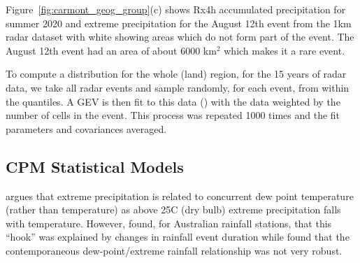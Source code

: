 \documentclass[11pt,a4paper]{article}
\begin{document}
Figure~\ref{fig:carmont_geog_group}(c) shows Rx4h accumulated precipitation for summer 2020 and  extreme precipitation for the August 12th event from the 1km radar dataset with white showing areas which do not form part of the event. The August 12th event had an area of about 6000 km$^2$ which makes it a rare event. 

To compute a distribution for the whole (land) region, for the 15 years of radar data, we take all radar events and sample randomly, for each event, from within the quantiles. A GEV is then fit to this data (\parencite{gilleland2016extremes}) with the data weighted by the number of cells in the event. This process was repeated 1000 times and the fit parameters and covariances averaged. 

\subsection{CPM Statistical Models}

\cite{fowler2021rainfall_extremes} argues that extreme precipitation is related to concurrent dew point temperature (rather than temperature) as above 25C (dry bulb) extreme precipitation falls with temperature.  However, \cite{Visser2021hook_precipitation} found, for Australian rainfall stations, that this ``hook'' was explained by changes in rainfall event duration while \cite{Seneviratne2021ippcc_chapter_extremes} found that the contemporaneous dew-point/extreme rainfall relationship was not very robust. 
\end{document}
